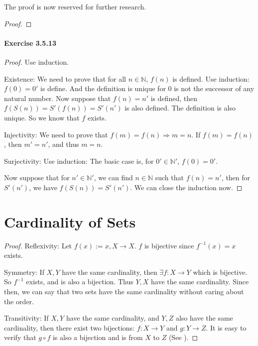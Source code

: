The proof is now reserved for further research.
\begin{proof}
\end{proof}

\paragraph{Exercise 3.5.13} \label{exercise3.5.13}
\begin{proof}
Use induction.

Existence: We need to prove that for all $n \in \mathbb{N}$, $f(n)$ is defined. Use induction:
$f(0) = 0'$ is define. And the definition is unique for $0$ is not the successor of any natural number. 
Now suppose that $f(n) = n'$ is defined, then $f(S(n)) = S'(f(n)) = S'(n')$ is also defined. The 
definition is also unique. So we know that $f$ exists.

Injectivity: We need to prove that $f(m) = f(n) \Longrightarrow m = n$. If $f(m) = f(n)$, then $m' = n'$, 
and thus $m=n$. 

Surjectivity: Use induction: 
The basic case is, for $0' \in \mathbb{N}'$, $f(0) = 0'$. 

Now suppose that for $n' \in \mathbb{N}'$, we can find $n \in \mathbb{N}$ such that $f(n) = n'$, then 
for $S'(n')$, we have $f(S(n)) = S'(n')$. We can close the induction now.
\end{proof}

\section{Cardinality of Sets}

\begin{proof}
Reflexivity: Let $f(x):= x, X \rightarrow X$. $f$ is bijective since $f^{-1}(x) = x$ exists.

Symmetry: If $X,Y$ have the same cardinality, then $\exists f:X\rightarrow Y$ which is bijective. So 
$f^{-1}$ exists, and is also a bijection. Thus $Y,X$ have the same cardinality. Since then, we can say 
that two sets have the same cardinality without caring about the order.

Transitivity: If $X,Y$ have the same cardinality, and $Y,Z$ also have the same cardinality, then there 
exist two bijections: $f:X \rightarrow Y$ and $g:Y \rightarrow Z$. It is easy to verify that $g \circ f$ 
is also a bijection and is from $X$ to $Z$ (See ).
\end{proof}

